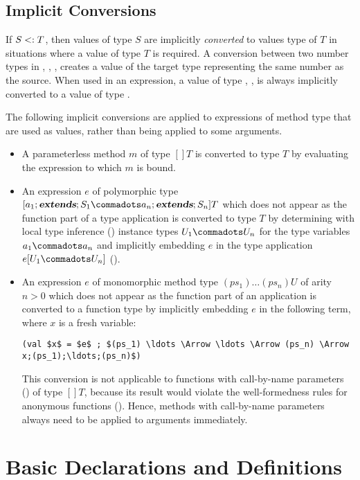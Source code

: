 \documentclass[11pt]{report}
\begin{document}
\section{Implicit Conversions}
\label{sec:impl-conv}

If $S <: T$, then values of type $S$ are implicitly {\em
converted} to values type of $T$ in situations where a value of type
$T$ is required. A conversion between two number types in \verb@Int@,
\verb@Long@, \verb@Float@, \verb@Double@ creates a value of the target
type representing the same number as the source.  When used in an
expression, a value of type \verb@Byte@, \verb@Char@, \verb@Short@ is
always implicitly converted to a value of type \verb@Int@.

The following implicit conversions are applied to expressions of
method type that are used as values, rather than being applied to some
arguments.
\begin{itemize}
\item
A parameterless method $m$ of type $[] T$
is converted to type $T$ by evaluating the expression to which $m$ is bound.
\item
An expression $e$ of polymorphic type $[a_1 \extends S_1 \commadots
a_n \extends S_n]T$ which does not appear as the function part of
a type application is converted to type $T$
by determining with local type inference
() instance types $U_1
\commadots U_n$ for the type variables $a_1 \commadots a_n$ and
implicitly embedding $e$ in the type application
$e[U_1 \commadots U_n]$ ().
\item
An expression $e$ of monomorphic method type
$(ps_1) \ldots (ps_n) U$ of arity $n > 0$
which does not appear as the function part of an application is
converted to a function type by implicitly embedding $e$ in
the following term, where $x$ is a fresh variable:
\begin{verbatim}
(val $x$ = $e$ ; $(ps_1) \ldots \Arrow \ldots \Arrow (ps_n) \Arrow x;(ps_1);\ldots;(ps_n)$)
\end{verbatim}
This conversion is not applicable to functions with call-by-name
parameters () of type $[]T$, because its result
would violate the well-formedness rules for anonymous functions
(). Hence, methods with call-by-name
parameters always need to be applied to arguments immediately.
\end{itemize}

\chapter{Basic Declarations and Definitions}
\label{sec:defs}
\end{document}
